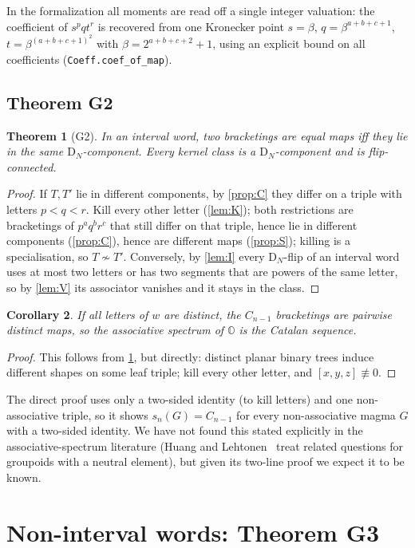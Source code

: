 \documentclass[11pt,a4paper]{article}
\newtheorem{thm}{Theorem}[section]
\newtheorem{corollary}[thm]{Corollary}
\theoremstyle{definition}
\theoremstyle{remark}
\newcommand{\OO}{\mathbb{O}}
\newcommand{\assoc}[3]{[#1,#2,#3]}
\newcommand{\DN}{\mathrm{D}_N}
\newcommand{\lean}[1]{\texttt{#1}}
\begin{document}
In the formalization all moments are read off a single integer valuation: the coefficient of $s^pqt^r$
is recovered from one Kronecker point $s=\beta$, $q=\beta^{a+b+c+1}$, $t=\beta^{(a+b+c+1)^2}$ with
$\beta=2^{a+b+c+2}+1$, using an explicit bound on all coefficients (\lean{Coeff.coef\_of\_map}).

\subsection{Theorem G2}

\begin{thm}[G2]\label{thm:G2}
In an interval word, two bracketings are equal maps iff they lie in the same $\DN$-component. Every
kernel class is a $\DN$-component and is flip-connected.
\end{thm}
\begin{proof}
If $T,T'$ lie in different components, by \cref{prop:C} they differ on a triple with letters $p<q<r$.
Kill every other letter (\cref{lem:K}); both restrictions are bracketings of $p^aq^br^c$ that still
differ on that triple, hence lie in different components (\cref{prop:C}), hence are different maps
(\cref{prop:S}); killing is a specialisation, so $T\not\sim T'$. Conversely, by \cref{lem:I} every
$\DN$-flip of an interval word uses at most two letters or has two segments that are powers of the same
letter, so by \cref{lem:V} its associator vanishes and it stays in the class.
\end{proof}

\begin{corollary}\label{cor:distinct}
If all letters of $w$ are distinct, the $C_{n-1}$ bracketings are pairwise distinct maps, so the
associative spectrum of $\OO$ is the Catalan sequence.
\end{corollary}
\begin{proof}
This follows from \cref{thm:G2}, but directly: distinct planar binary trees induce different shapes on
some leaf triple; kill every other letter, and $\assoc xyz\not\equiv0$.
\end{proof}
The direct proof uses only a two-sided identity (to kill letters) and one non-associative triple, so it
shows $s_n(G)=C_{n-1}$ for every non-associative magma $G$ with a two-sided identity. We have not found
this stated explicitly in the associative-spectrum literature (Huang and Lehtonen~\cite{HL22} treat
related questions for groupoids with a neutral element), but given its two-line proof we expect it to be
known.

\section{Non-interval words: Theorem G3}\label{sec:noninterval}
\end{document}
